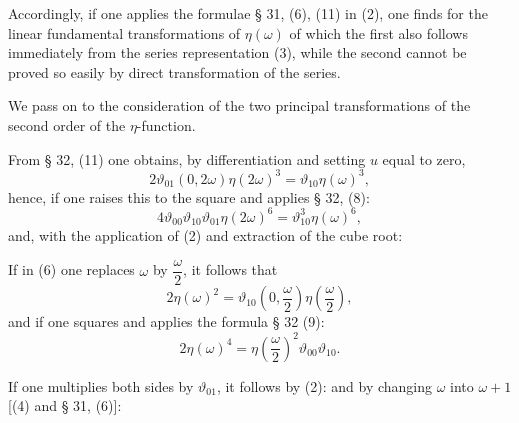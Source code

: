 
Accordingly, if one applies the formulae § 31, (6), (11) in (2), one
finds for the linear fundamental transformations of
$\eta(\omega)$
of which the first also follows immediately from the series representation
(3), while the second cannot be proved so easily by direct
transformation of the series.

We pass on to the consideration of the two principal transformations
of the second order of the $\eta$-function.

From § 32, (11) one obtains, by differentiation and setting
$u$ equal to zero,
\[ 2\vartheta_{01}(0, 2\omega)\eta(2\omega)^3 = \vartheta_{10}\eta(\omega)^3, \]
hence, if one raises this to the square and applies § 32, (8):
\[ 4\vartheta_{00}\vartheta_{10}\vartheta_{01}\eta(2\omega)^6 = \vartheta_{10}^3\eta(\omega)^6, \]
and, with the application of (2) and extraction of the cube root:

If in (6) one replaces $\omega$ by $\dfrac{\omega}{2}$, it follows that
\[ 2\eta(\omega)^2 = \vartheta_{10}\left(0, \frac{\omega}{2}\right)\eta\left(\frac{\omega}{2}\right), \]
and if one squares and applies the formula § 32 (9):
\[ 2\eta(\omega)^4 = \eta\left(\frac{\omega}{2}\right)^2\vartheta_{00}\vartheta_{10}. \]

If one multiplies both sides by $\vartheta_{01}$, it follows
by (2):
and by changing $\omega$ into $\omega+1$ [(4) and § 31,
(6)]:
